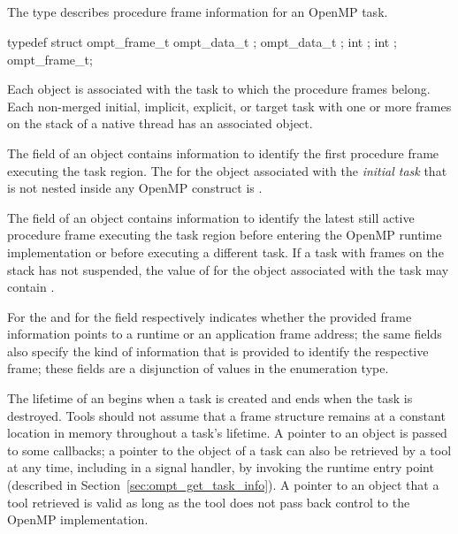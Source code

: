 \subsection{}
\label{sec:ompt_frame_t}
\label{subsubsubsec:ompt_frame_t}

\summary
The  type describes procedure frame information 
for an OpenMP task.

\syntax
\begin{ccppspecific}
\begin{ompSyntax}
typedef struct ompt_frame_t {
  ompt_data_t ;
  ompt_data_t ;
  int ;
  int ;
} ompt_frame_t;
\end{ompSyntax}
\end{ccppspecific}

\descr
Each  object is associated with the task to which 
the procedure frames belong. Each non-merged initial, implicit, explicit, 
or target task with one or more frames on the stack of a native thread 
has an associated  object.

The  field of an  object contains
information to identify the first procedure frame executing the task region.
The  for the  object associated with 
the \emph{initial task} that is not nested inside any OpenMP construct 
is .

The  field of an  object contains
information to identify the latest still active procedure frame 
executing the task region before entering the OpenMP runtime 
implementation or before executing a different task. If a task with 
frames on the stack has not suspended, the value of  
for the  object associated with the task may 
contain .

For  the  and for  
the  field respectively indicates whether the 
provided frame information points to a runtime or an application frame 
address; the same fields also specify the kind of information that is 
provided to identify the respective frame; these fields are a disjunction 
of values in the  enumeration type.

The lifetime of an  begins when a task is created
and ends when the task is destroyed. Tools should not assume that
a frame structure remains at a constant location in memory throughout
a task's lifetime. A pointer to an  object is passed 
to some callbacks; a pointer to the  object of a task
can also be retrieved by a tool at any time, including in a signal
handler, by invoking the  runtime entry point 
(described in Section~\ref{sec:ompt_get_task_info}). A pointer to an 
 object that a tool retrieved is valid as long as 
the tool does not pass back control to the OpenMP implementation.

